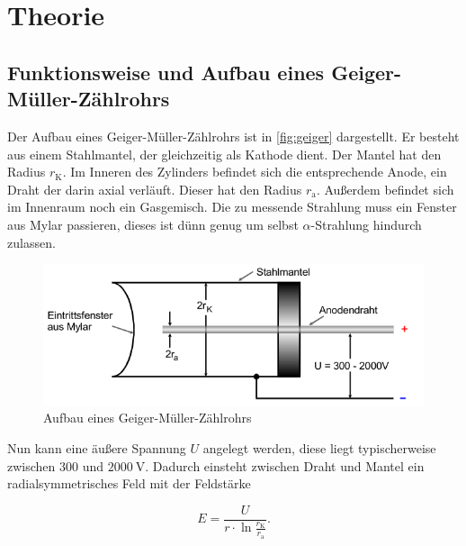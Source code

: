 \section{Theorie}
\label{sec:Theorie}




\subsection{Funktionsweise und Aufbau eines Geiger-Müller-Zählrohrs}
\label{ssec:t1}

Der Aufbau eines Geiger-Müller-Zählrohrs ist in \autoref{fig:geiger} dargestellt.
Er besteht aus einem Stahlmantel, der gleichzeitig als Kathode dient. 
Der Mantel hat den Radius $r_\text{K}$.
Im Inneren des Zylinders befindet sich die entsprechende Anode, ein Draht der darin axial verläuft.
Dieser hat den Radius $r_\text{a}$.
Außerdem befindet sich im Innenraum noch ein Gasgemisch.
Die zu messende Strahlung muss ein Fenster aus Mylar passieren, dieses ist dünn genug um selbst $\alpha$-Strahlung hindurch zulassen.

\begin{figure}
    \centering
    \includegraphics[width=\textwidth]{images/bild2.png}
    \caption{Aufbau eines Geiger-Müller-Zählrohrs}
    \label{fig:geiger}
\end{figure}

Nun kann eine äußere Spannung $U$ angelegt werden, diese liegt typischerweise zwischen $300$ und $\SI{2000}{\volt}$.
Dadurch einsteht zwischen Draht und Mantel ein radialsymmetrisches Feld mit der Feldstärke 

\begin{equation}
    E = \frac{U}{r \cdot \ln{\frac{r_\text{K}}{r_\text{a}}}}.
    \label{eq:energie}
\end{equation}


